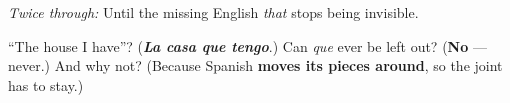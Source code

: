 \emph{Twice through:} Until the missing English \emph{that} stops being invisible.

\begin{tcolorbox}[breakable,colback=teal!4,colframe=teal!35!black,title={Before you move on}]
\textquotedblleft{}The house I have\textquotedblright{}? (\emph{\textbf{La casa que tengo}}.) Can \emph{que} ever be left out? (\textbf{No} — never.) And why not? (Because Spanish \textbf{moves its pieces around}, so the joint has to stay.)
\end{tcolorbox}
